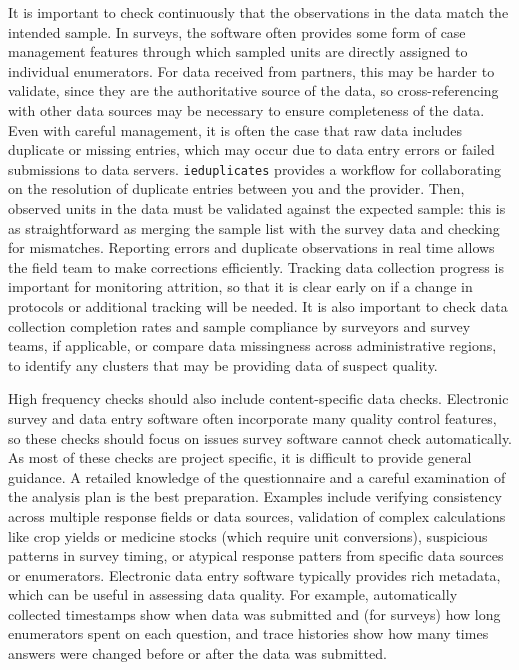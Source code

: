 It is important to check continuously that the observations in the data match the intended sample.
In surveys, the software often provides some form of case management features
through which sampled units are directly assigned to individual enumerators.
For data received from partners, this may be harder to validate,
since they are the authoritative source of the data,
so cross-referencing with other data sources may be necessary to ensure completeness of the data.
Even with careful management, it is often the case that raw data includes duplicate or missing entries,
which may occur due to data entry errors or failed submissions to data servers.
\texttt{ieduplicates}
provides a workflow for collaborating on the resolution of duplicate entries between you and the provider.
Then, observed units in the data must be validated against the expected sample:
this is as straightforward as merging the sample list with the survey data and checking for mismatches.
Reporting errors and duplicate observations in real time allows the field team to make corrections efficiently.
Tracking data collection progress is important for monitoring attrition,
so that it is clear early on if a change in protocols or additional tracking will be needed.
It is also important to check data collection completion rates
and sample compliance by surveyors and survey teams, if applicable,
or compare data missingness across administrative regions,
to identify any clusters that may be providing data of suspect quality.

High frequency checks should also include content-specific data checks.
Electronic survey and data entry software often incorporate many quality control features,
so these checks should focus on issues survey software cannot check automatically.
As most of these checks are project specific,
it is difficult to provide general guidance.
A retailed knowledge of the questionnaire and a careful examination of the analysis plan
is the best preparation.
Examples include verifying consistency across multiple response fields or data sources,
validation of complex calculations like crop yields or medicine stocks (which require unit conversions),
suspicious patterns in survey timing,
or atypical response patters from specific data sources or enumerators.
Electronic data entry software typically provides rich metadata,
which can be useful in assessing data quality.
For example, automatically collected timestamps show when data was submitted
and (for surveys) how long enumerators spent on each question,
and trace histories show how many
times answers were changed before or after the data was submitted.

